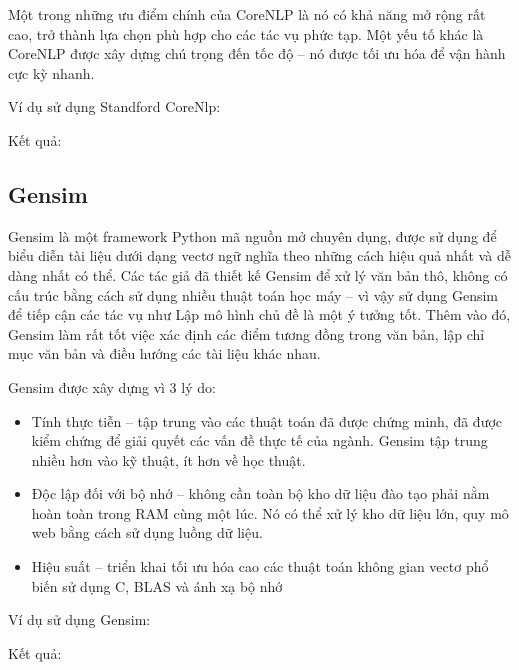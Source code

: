 Một trong những ưu điểm chính của CoreNLP là nó có khả năng mở rộng rất cao, trở thành lựa chọn phù hợp cho các tác vụ phức tạp. Một yếu tố khác là CoreNLP được xây dựng chú trọng đến tốc độ – nó được tối ưu hóa để vận hành cực kỳ nhanh. \cite{WEBSITE:3}

Ví dụ sử dụng Standford CoreNlp:



Kết quả:



\subsection{Gensim}
Gensim là một framework Python mã nguồn mở chuyên dụng, được sử dụng để biểu diễn tài liệu dưới dạng vectơ ngữ nghĩa theo những cách hiệu quả nhất và dễ dàng nhất có thể. Các tác giả đã thiết kế Gensim để xử lý văn bản thô, không có cấu trúc bằng cách sử dụng nhiều thuật toán học máy – vì vậy sử dụng Gensim để tiếp cận các tác vụ như Lập mô hình chủ đề là một ý tưởng tốt. Thêm vào đó, Gensim làm rất tốt việc xác định các điểm tương đồng trong văn bản, lập chỉ mục văn bản và điều hướng các tài liệu khác nhau.\cite{WEBSITE:3}

Gensim được xây dựng vì 3 lý do:

\begin{itemize}
	\item Tính thực tiễn – tập trung vào các thuật toán đã được chứng minh, đã được kiểm chứng để giải quyết các vấn đề thực tế của ngành. Gensim tập trung nhiều hơn vào kỹ thuật, ít hơn về học thuật.
	\item Độc lập đối với bộ nhớ – không cần toàn bộ kho dữ liệu đào tạo phải nằm hoàn toàn trong RAM cùng một lúc. Nó có thể xử lý kho dữ liệu lớn, quy mô web bằng cách sử dụng luồng dữ liệu.
	\item Hiệu suất – triển khai tối ưu hóa cao các thuật toán không gian vectơ phổ biến sử dụng C, BLAS và ánh xạ bộ nhớ
\end{itemize}

Ví dụ sử dụng Gensim:



Kết quả:





			
			
			
